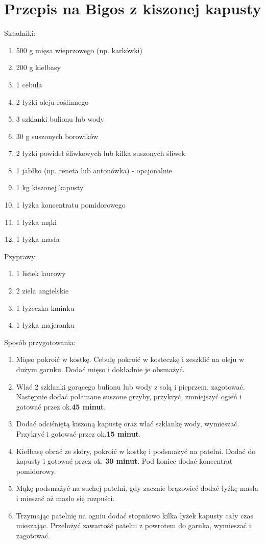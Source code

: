 \documentclass[12pt, letterpaper, titlepage]{article}
\begin{document}
\section{Przepis na Bigos z kiszonej kapusty}

Składniki:
\begin{enumerate}
\item 500 g mięsa wieprzowego (np. karkówki)
\item 200 g kiełbasy
\item 1 cebula
\item 2 łyżki oleju roślinnego
\item 3 szklanki bulionu lub wody
\item 30 g suszonych borowików
\item 2 łyżki powideł śliwkowych lub kilka suszonych śliwek
\item 1 jabłko (np. reneta lub antonówka) - opcjonalnie
\item 1 kg kiszonej kapusty
\item 1 łyżka koncentratu pomidorowego
\item 1 łyżka mąki
\item 1 łyżka masła
\end{enumerate}
Pzyprawy:
\begin{enumerate}
\item 1 listek laurowy
\item 2 ziela angielskie
\item 1 łyżeczka kminku
\item 1 łyżka majeranku
\end{enumerate}
Sposób przygotowania:
\begin{enumerate}[•]
\item Mięso pokroić w kostkę. Cebulę pokroić w kosteczkę i zeszklić na oleju w dużym garnku. Dodać mięso i dokładnie je obsmażyć.
\item Wlać 2 szklanki gorącego bulionu lub wody z solą i pieprzem, zagotować. Następnie dodać połamane suszone grzyby, przykryć, zmniejszyć ogień i gotować przez ok.\textbf{45 minut}.
\item Dodać odciśniętą kiszoną kapustę oraz wlać szklankę wody, wymieszać. Przykryć i gotować przez ok.\textbf{15 minut}.
\item 	Kiełbasę obrać ze skóry, pokroić w kostkę i podsmażyć na patelni. Dodać do kapusty i gotować przez ok. \textbf{30 minut}. Pod koniec dodać koncentrat pomidorowy.
\item Mąkę podsmażyć na suchej patelni, gdy zacznie brązowieć dodać łyżkę masła i mieszać aż masło się rozpuści.
\item  Trzymając patelnię na ogniu dodać stopniowo kilka łyżek kapusty cały czas mieszając. Przełożyć zawartość patelni z powrotem do garnka, wymieszać i zagotować.
\end{enumerate}
\end{document}
